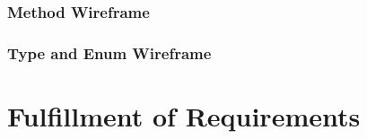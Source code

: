 \subsubsection{Method Wireframe}

\subsubsection{Type and Enum Wireframe}


\section{Fulfillment of Requirements}
%

